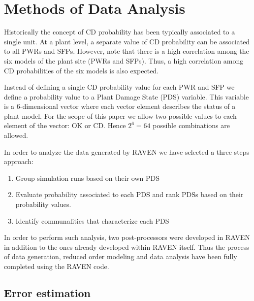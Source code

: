 \section{Methods of Data Analysis}
\label{sec:plantAnalysisResults}

Historically the concept of CD probability has been typically 
associated to a single unit. At a plant level, a separate value of CD 
probability can be associated to all PWRs and SFPs. However, note that there 
is a high correlation among the six models of the plant site (PWRs and SFPs). 
Thus, a high correlation among CD probabilities of the six models is also expected.

Instead of defining a single CD probability value for each PWR and SFP 
we define a probability value to a Plant Damage State (PDS) variable. This 
variable is a $6$-dimensional vector where each vector element describes the 
status of a plant model. For the scope of this paper we allow two possible 
values to each element of the vector: OK or CD. Hence $2^6=64$ possible 
combinations are allowed.

In order to analyze the data generated by RAVEN we have selected a three steps 
approach:
\begin{enumerate}
  \item Group simulation runs based on their own PDS  
  \item Evaluate probability associated to each PDS and rank PDSs based on 
        their probability values.
  \item Identify communalities that characterize each PDS
\end{enumerate}

In order to perform such analysis, two post-processors were developed in RAVEN in 
addition to the ones already developed within RAVEN itself.
Thus the process of data generation, reduced order modeling and data analysis 
have been fully completed using the RAVEN code.

\subsection{Error estimation}

